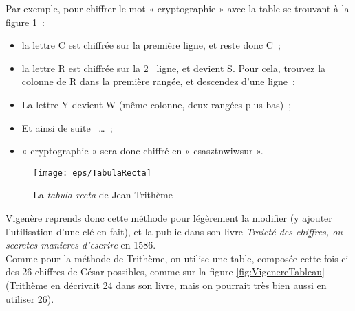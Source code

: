 Par exemple, pour chiffrer le mot « cryptographie » avec la table se
trouvant à la figure \ref{fig:TabulaRecta}~: 
\begin{itemize}
  \item la lettre C est chiffrée sur la première ligne, et reste
    donc C~;
  \item la lettre R est chiffrée sur la 2\ieme~ ligne, et devient
    S. Pour cela, trouvez la colonne de R dans la première rangée, et
    descendez d'une ligne~;
  \item La lettre Y devient W (même colonne, deux rangées plus bas)~;
  \item Et ainsi de suite ~\dots~;
  \item « cryptographie » sera donc chiffré en « csasztnwiwsur ».
\end{itemize}

\begin{figure}[h]
  \begin{center}
    \texttt{[image: eps/TabulaRecta]}
  \end{center}
  \caption{La \emph{tabula recta} de Jean Trithème}
  \label{fig:TabulaRecta}
\end{figure}

Vigenère reprends donc cette méthode pour légèrement la modifier (y
ajouter l'utilisation d'une clé en fait), et la publie dans son livre
\emph{Traicté des chiffres, ou secretes
  manieres d'escrire} en 1586. \\

Comme pour la méthode de Trithème, on utilise une table, composée
cette fois ci des 26 chiffres de César possibles, comme sur la figure
\ref{fig:VigenereTableau} (Trithème en décrivait 24 dans son livre,
mais on pourrait très bien aussi en utiliser 26). \\

